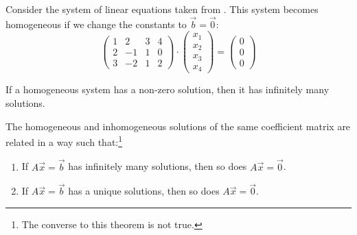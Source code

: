 \begin{exm}\label{exm-homogeneous-system}
	Consider the system of linear equations taken from .
	This system becomes homogeneous if we change the constants to $\vec{b}=\vec{0}$:
	\begin{equation*}
		\begin{pmatrix}
			1 & 2  & 3 & 4 \\
			2 & -1 & 1 & 0 \\
			3 & -2 & 1 & 2
		\end{pmatrix}\cdot
		\begin{pmatrix}
			x_1 \\
			x_2 \\
			x_3 \\
			x_4
		\end{pmatrix}=
		\begin{pmatrix}
			0 \\
			0 \\
			0
		\end{pmatrix}
	\end{equation*}
\end{exm}

\begin{thm}\label{thm-homogeneous-inf-solutions}
	If a homogeneous system has a non-zero solution, then it has infinitely many
	solutions.
\end{thm}

\begin{thm}\label{thm-homogeneous-solutions}
	The homogeneous and inhomogeneous solutions of the same coefficient matrix
	are related in a way such that:\footnote{The converse to this theorem
		is not true.}
	\begin{enumerate}
		\item If $A\vec{x}=\vec{b}$ has infinitely many solutions, then so does
		      $A\vec{x}=\vec{0}$.
		\item If $A\vec{x}=\vec{b}$ has a unique solutions, then so does
		      $A\vec{x}=\vec{0}$.
	\end{enumerate}
\end{thm}

